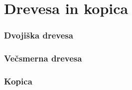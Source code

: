 \chapter{Drevesa in kopica}

\subsection{Dvojiška drevesa}


\subsection{Večsmerna drevesa}


\subsection{Kopica}
